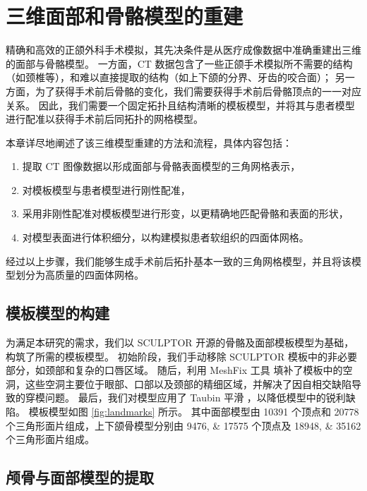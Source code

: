 
\chapter{三维面部和骨骼模型的重建}
\label{cha:reconstruction}

精确和高效的正颌外科手术模拟，其先决条件是从医疗成像数据中准确重建出三维的面部与骨骼模型。
一方面，CT 数据包含了一些正颌手术模拟所不需要的结构（如颈椎等），和难以直接提取的结构（如上下颌的分界、牙齿的咬合面）；
另一方面，为了获得手术前后骨骼的变化，我们需要获得手术前后骨骼顶点的一一对应关系。
因此，我们需要一个固定拓扑且结构清晰的模板模型，并将其与患者模型进行配准以获得手术前后同拓扑的网格模型。

本章详尽地阐述了该三维模型重建的方法和流程，具体内容包括：
\begin{enumerate}
  \item 提取 CT 图像数据以形成面部与骨骼表面模型的三角网格表示，
  \item 对模板模型与患者模型进行刚性配准，
  \item 采用非刚性配准对模板模型进行形变，以更精确地匹配骨骼和表面的形状，
  \item 对模型表面进行体积细分，以构建模拟患者软组织的四面体网格。
\end{enumerate}
经过以上步骤，我们能够生成手术前后拓扑基本一致的三角网格模型，并且将该模型划分为高质量的四面体网格。

\section{模板模型的构建}

为满足本研究的需求，我们以 SCULPTOR \cite{qiuSCULPTORSkeletonconsistentFace2022a} 开源的骨骼及面部模板模型为基础，构筑了所需的模板模型。
初始阶段，我们手动移除 SCULPTOR 模板中的非必要部分，如颈部和复杂的口唇区域。
随后，利用 MeshFix 工具 \cite{atteneLightweightApproachRepairing2010} 填补了模板中的空洞，这些空洞主要位于眼部、口部以及颈部的精细区域，并解决了因自相交缺陷导致的穿模问题。
最后，我们对模型应用了 Taubin 平滑 \cite{vollmerImprovedLaplacianSmoothing1999}，以降低模型中的锐利缺陷。
模板模型如图 \ref{fig:landmarks} 所示。
其中面部模型由 \num{10391} 个顶点和 \num{20778} 个三角形面片组成，上下颌骨模型分别由 \numlist{9476; 17575} 个顶点及 \numlist{18948; 35162} 个三角形面片组成。

\section{颅骨与面部模型的提取}

